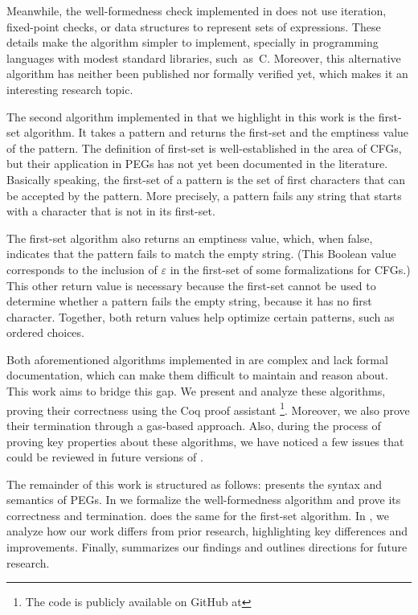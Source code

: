 Meanwhile,
the well-formedness check implemented in \lpeg{}
does not use iteration, fixed-point checks,
or data structures to represent sets of expressions.
These details make the algorithm simpler to implement,
specially in programming languages
with modest standard libraries, such~as~C.
Moreover,
this alternative algorithm
has neither been published nor formally verified yet,
which makes it an interesting research topic.

The second algorithm implemented in \lpeg{}
that we highlight in this work is
the first-set algorithm.
It takes a pattern
and returns the first-set and the emptiness value
of the pattern.
The definition of first-set
is well-established in the area of CFGs,
but their application in PEGs has not yet
been documented in the literature.
Basically speaking,
the first-set of a pattern
is the set of first characters
that can be accepted by the pattern.
More precisely,
a pattern fails any string
that starts with a character
that is not in its first-set.

The first-set algorithm also returns an emptiness value,
which, when false, indicates that the pattern
fails to match the empty string.
(This Boolean value corresponds to the inclusion of
$\varepsilon$ in the first-set of some formalizations for CFGs.)
This other return value is necessary because
the first-set cannot be used to determine whether
a pattern fails the empty string,
because it has no first character.
Together, both return values
help \lpeg{} optimize certain patterns,
such as ordered choices.

Both aforementioned algorithms implemented in \lpeg{}
are complex and lack formal documentation,
which can make them difficult to maintain and reason about.
This work aims to bridge this gap.
We present and analyze these algorithms,
proving their correctness using the Coq proof assistant%
\footnote{The code is publicly available on
GitHub at }.
Moreover, we also prove their termination through a gas-based approach.
Also, during the process of proving
key properties about these algorithms,
we have noticed a few issues
that could be reviewed
in future versions of \lpeg{}.

The remainder of this work is structured as follows:
 presents the syntax and semantics of PEGs.
In 
we formalize the well-formedness algorithm
and prove its correctness and termination.
does the same for the first-set algorithm.
In ,
we analyze how our work differs from prior research,
highlighting key differences and improvements.
Finally, 
summarizes our findings and outlines directions
for future research.